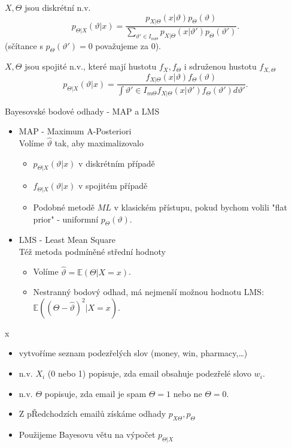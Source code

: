 \documentclass[../main.tex]{subfiles}
\begin{document}
\begin{theorem}
    $X,\Theta$ jsou diskrétní n.v.
    \[p_{\Theta|X} (\vartheta | x) = \frac{p_{X|\Theta}(x|\vartheta)p_\Theta(\vartheta)}{\sum_{\vartheta' \in I_{m\Theta}}p_{X|\Theta}(x|\vartheta')p_\Theta(\vartheta')}.\]
    (sčítance s $p_\Theta(\vartheta') = 0$ považujeme za 0).
\end{theorem}
\begin{theorem}
    $X,\Theta$ jsou spojité n.v., které mají hustotu $f_X, f_\Theta$ i sdruženou hustotu $f_{X,\Theta}$
    \[p_{\Theta|X} (\vartheta | x) = \frac{f_{X|\Theta}(x|\vartheta)f_\Theta(\vartheta)}{\int{\vartheta' \in I_{m\Theta}}f_{X|\Theta}(x|\vartheta')f_\Theta(\vartheta')d\vartheta'}.\]
    
\end{theorem}

Bayesovské bodové odhady - MAP a LMS
\begin{itemize}
\item 
MAP - Maximum A-Posteriori\\
Volíme $\widehat{\vartheta}$ tak, aby maximalizovalo
\begin{itemize}
    \item $p_{\Theta|X}(\vartheta|x)$ v diskrétním případě
    \item $f_{\Theta|X}(\vartheta|x)$ v spojitém případě
    \item Podobné metodě $ML$ v klasickém přístupu, pokud bychom volili "flat prior" - uniformní $p_\Theta(\vartheta)$.
\end{itemize}
\item
LMS - Least Mean Square\\
Též metoda podmíněné střední hodnoty
\begin{itemize}
    \item Volíme $\widehat{\vartheta} = \mathbb{E}(\Theta|X = x)$.
    \item Nestranný bodový odhad, má nejmenší možnou hodnotu LMS: $\mathbb{E}((\Theta - \widehat{\vartheta})^2 |X = x)$.
\end{itemize}
\end{itemize}

\begin{example}
    {\color{white} x}
    \begin{itemize}
        \item vytvoříme seznam podezřelých slov (money, win, pharmacy,\dots)
        \item n.v. $X_i$ (0 nebo 1) popisuje, zda email obsahuje podezřelé slovo $w_i$.
        \item n.v. $\Theta$ popisuje, zda email je spam $\Theta = 1$ nebo ne $\Theta = 0$.
        \item Z pŘedchodzích emailů získáme odhady $p_{X\Theta}, p_\Theta$
        \item Použijeme Bayesovu větu na výpočet $p_{\Theta | X}$ 
    \end{itemize}
\end{example}
\end{document}
